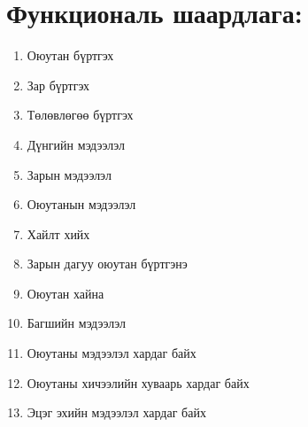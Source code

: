 \documentclass[12pt]{article}
\begin{document}
	\section{Функциональ шаардлага:}
	\begin{enumerate}
		\item Оюутан бүртгэх
		\item Зар бүртгэх
		\item Төлөвлөгөө бүртгэх
		\item Дүнгийн мэдээлэл
		\item Зарын мэдээлэл
		\item Оюутанын мэдээлэл
		\item Хайлт хийх
		\item Зарын дагуу оюутан бүртгэнэ
		\item Оюутан хайна
		\item Багшийн мэдээлэл
		\item Оюутаны мэдээлэл хардаг байх
		\item Оюутаны хичээлийн хуваарь хардаг байх
		\item Эцэг эхийн мэдээлэл хардаг байх
		
	\end{enumerate}
	
\end{document}

